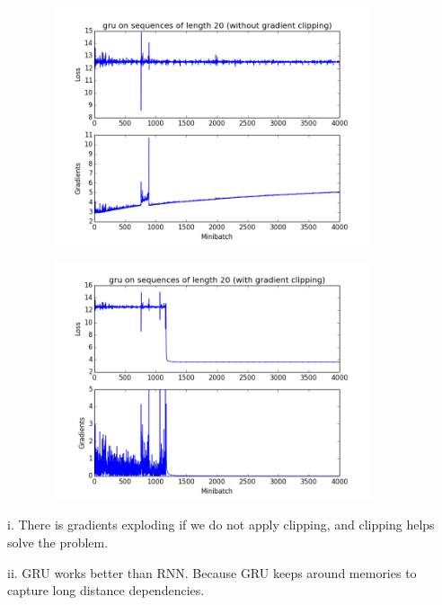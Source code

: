 \documentclass{article}
\theoremstyle{definition}
\theoremstyle{remark}
\numberwithin{equation}{section}
\begin{document}
  \begin{figure}[H] 
  \centering
 \includegraphics[width=100mm, height=70mm]{fig/q3-noclip-gru.png}
   \caption{}
   \label{fig: noclip_gru}
 \end{figure}
 
  \begin{figure}[H] 
  \centering
 \includegraphics[width=100mm, height=70mm]{fig/q3-clip-gru.png}
   \caption{}
   \label{fig: clip_gru}
 \end{figure}
 
 i. There is gradients exploding if we do not apply clipping, and clipping helps solve the problem.
 
 \vspace{10pt}
 
 ii. GRU works better than RNN. Because GRU keeps around memories to capture long distance dependencies.
 
\end{document}
